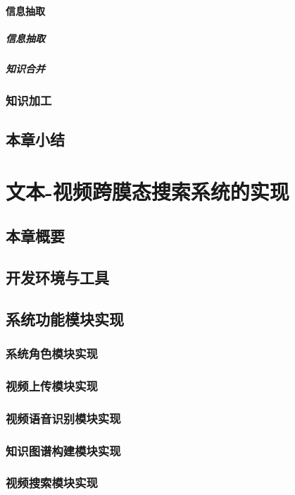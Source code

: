 \documentclass[12pt,a4paper,fancyhdr,openany,oneside]{ctexbook}
\begin{document}
\subsubsection{信息抽取}
\paragraph{信息抽取}
\paragraph{知识合并}




\subsection{知识加工}
\section{本章小结}
% 
\chapter{文本-视频跨膜态搜索系统的实现}
\section{本章概要}
\section{开发环境与工具}
\section{系统功能模块实现}
\subsection{系统角色模块实现}
\subsection{视频上传模块实现}
\subsection{视频语音识别模块实现}
\subsection{知识图谱构建模块实现}
\subsection{视频搜索模块实现}
\end{document}
